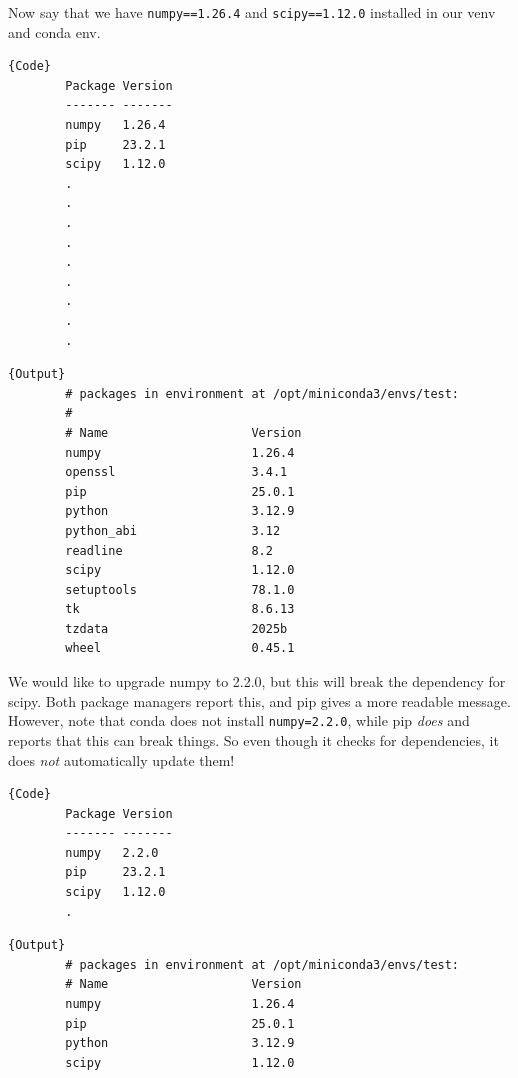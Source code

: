   \begin{example}
    \label{ex:dependency-updating}
    Now say that we have \texttt{numpy==1.26.4} and \texttt{scipy==1.12.0} installed in our venv and conda env. 

    \noindent\begin{minipage}{.35\textwidth}
      \begin{lstlisting}[]{Code}
        Package Version
        ------- -------
        numpy   1.26.4
        pip     23.2.1
        scipy   1.12.0 
        .
        .
        .
        .
        .
        .
        .
        .
        .
      \end{lstlisting}
      \end{minipage}
      \hfill
      \begin{minipage}{.64\textwidth}
      \begin{lstlisting}[]{Output}
        # packages in environment at /opt/miniconda3/envs/test:
        #
        # Name                    Version   
        numpy                     1.26.4    
        openssl                   3.4.1     
        pip                       25.0.1    
        python                    3.12.9    
        python_abi                3.12      
        readline                  8.2       
        scipy                     1.12.0    
        setuptools                78.1.0    
        tk                        8.6.13    
        tzdata                    2025b     
        wheel                     0.45.1    
      \end{lstlisting}
    \end{minipage}

    We would like to upgrade numpy to 2.2.0, but this will break the dependency for scipy. Both package managers report this, and pip gives a more readable message. However, note that conda does not install \texttt{numpy=2.2.0}, while pip \textit{does} and reports that this can break things. So even though it checks for dependencies, it does \textit{not} automatically update them!

    \noindent\begin{minipage}{.35\textwidth}
      \begin{lstlisting}[]{Code}
        Package Version
        ------- -------
        numpy   2.2.0
        pip     23.2.1
        scipy   1.12.0 
        .
      \end{lstlisting}
      \end{minipage}
      \hfill
      \begin{minipage}{.64\textwidth}
      \begin{lstlisting}[]{Output}
        # packages in environment at /opt/miniconda3/envs/test:
        # Name                    Version   
        numpy                     1.26.4    
        pip                       25.0.1    
        python                    3.12.9    
        scipy                     1.12.0    
      \end{lstlisting}
    \end{minipage}
  \end{example}

